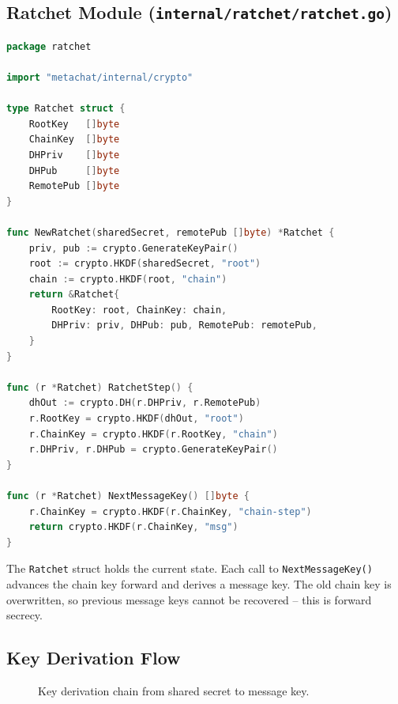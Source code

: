 \documentclass[12pt,a4paper]{article}
\begin{document}
\subsection{Ratchet Module (\texttt{internal/ratchet/ratchet.go})}

\begin{lstlisting}[language=Go, caption={Double Ratchet implementation.}]
package ratchet

import "metachat/internal/crypto"

type Ratchet struct {
    RootKey   []byte
    ChainKey  []byte
    DHPriv    []byte
    DHPub     []byte
    RemotePub []byte
}

func NewRatchet(sharedSecret, remotePub []byte) *Ratchet {
    priv, pub := crypto.GenerateKeyPair()
    root := crypto.HKDF(sharedSecret, "root")
    chain := crypto.HKDF(root, "chain")
    return &Ratchet{
        RootKey: root, ChainKey: chain,
        DHPriv: priv, DHPub: pub, RemotePub: remotePub,
    }
}

func (r *Ratchet) RatchetStep() {
    dhOut := crypto.DH(r.DHPriv, r.RemotePub)
    r.RootKey = crypto.HKDF(dhOut, "root")
    r.ChainKey = crypto.HKDF(r.RootKey, "chain")
    r.DHPriv, r.DHPub = crypto.GenerateKeyPair()
}

func (r *Ratchet) NextMessageKey() []byte {
    r.ChainKey = crypto.HKDF(r.ChainKey, "chain-step")
    return crypto.HKDF(r.ChainKey, "msg")
}
\end{lstlisting}

The \texttt{Ratchet} struct holds the current state. Each call to \texttt{NextMessageKey()} advances the chain key forward and derives a message key. The old chain key is overwritten, so previous message keys cannot be recovered -- this is forward secrecy.

\subsection{Key Derivation Flow}

\begin{figure}[H]
\centering
{}
\caption{Key derivation chain from shared secret to message key.}
\label{fig:kdf}
\end{figure}
\end{document}
